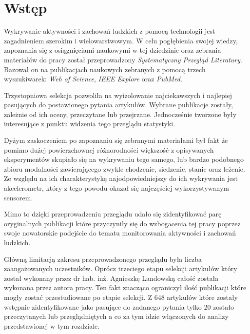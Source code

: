 \section{Wstęp}
Wykrywanie aktywności i zachowań ludzkich z pomocą technologii jest zagadnieniem szerokim i wielowarstwowym. W celu pogłębienia swojej wiedzy, zapoznania się z osiągnięciami naukowymi w tej dziedzinie oraz zebrania materiałów do pracy został przeprowadzony \textit{Systematyczny Przegląd Literatury}. Bazował on na publikacjach naukowych zebranych z pomocą trzech wyszukiwarek: \textit{Web of Science}, \textit{IEEE Explore} oraz \textit{PubMed}. 

Trzystopniowa selekcja pozwoliła na wyizolowanie najciekawszych i najlepiej pasujących do postawionego pytania artykułów. Wybrane publikacje zostały, zależnie od ich oceny, przeczytane lub przejrzane. Jednocześnie tworzone były interesujące z punktu widzenia tego przeglądu statystyki. 

Dyżym zaskoczeniem po zapoznaniu się zebranymi materiałami był fakt że pomimo dużej powierzchownej  różnorodności większość z opisywanych eksperymentów skupiało się na wykrywaniu tego samego, lub bardzo podobnego zbioru modalności zawierającego zwykle chodzenie, siedzenie, stanie oraz leżenie. Ze względu na ich charakterystykę najodpowiedniejszy do ich wykrywania jest akcelerometr, który z tego powodu okazał się najczęściej wykorzystywanym sensorem.

Mimo to dzięki przeprowadzeniu przeglądu udało się zidentyfikować parę oryginalnych publikacji które przyczyniły się do wzbogacenia tej pracy poprzez swoje nowatorskie podejście do tematu monitorowania aktywności i zachowań ludzkich.

Główną limitacją zakresu przeprowadzonego przeglądu była liczba zaangażowanych uczestników. Oprócz trzeciego etapu selekcji artykułów który został wykonany przez dr hab. inż. Agnieszkę Landowską całość została wykonana przez autora pracy. Ten fakt znacząco ograniczył ilość publikacji które mogły zostać przestudiowane po etapie selekcji. Z 648 artykułów które zostały wstępnie zidentyfikowane jako pasujące do zadanego pytania tylko 20 zostało przeczytanych lub przeglądniętych a co za tym idzie włączonych do analizy przedstawionej w tym rozdziale.
